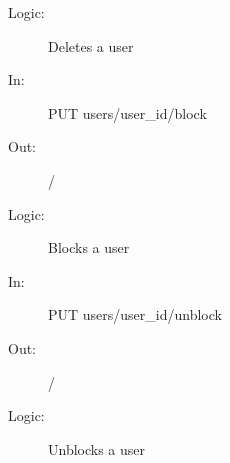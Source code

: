 \documentclass{article}
\begin{document}
\begin{description}
\begin{description}
        \item[Logic:] Deletes a user
        \item[]
    \end{description}
    \begin{description}
        \item[In:] PUT users/user\_id/block
        \item[Out:] /
        \item[Logic:] Blocks a user
        \item[]
    \end{description}
    \begin{description}
        \item[In:] PUT users/user\_id/unblock
        \item[Out:] /
        \item[Logic:] Unblocks a user
    \end{description}
\end{description}
\end{document}
